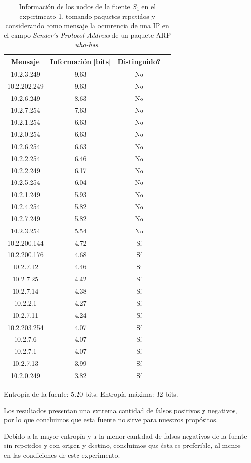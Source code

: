 \begin{table}[t]
    \centering
    \begin{tabular}{ | c | c | c | l |}
        \hline
        Mensaje & Información [bits] & Distinguido?\\
\hline
10.2.3.249 & 9.63 & No \\
\hline
10.2.202.249 & 9.63 & No \\
\hline
10.2.6.249 & 8.63 & No \\
\hline
10.2.7.254 & 7.63 & No \\
\hline
10.2.1.254 & 6.63 & No \\
\hline
10.2.0.254 & 6.63 & No \\
\hline
10.2.6.254 & 6.63 & No \\
\hline
10.2.2.254 & 6.46 & No \\
\hline
10.2.2.249 & 6.17 & No \\
\hline
10.2.5.254 & 6.04 & No \\
\hline
10.2.1.249 & 5.93 & No \\
\hline
10.2.4.254 & 5.82 & No \\
\hline
10.2.7.249 & 5.82 & No \\
\hline
10.2.3.254 & 5.54 & No \\
\hline
10.2.200.144 & 4.72 & Sí \\
\hline
10.2.200.176 & 4.68 & Sí \\
\hline
10.2.7.12 & 4.46 & Sí \\
\hline
10.2.7.25 & 4.42 & Sí \\
\hline
10.2.7.14 & 4.38 & Sí \\
\hline
10.2.2.1 & 4.27 & Sí \\
\hline
10.2.7.11 & 4.24 & Sí \\
\hline
10.2.203.254 & 4.07 & Sí \\
\hline
10.2.7.6 & 4.07 & Sí \\
\hline
10.2.7.1 & 4.07 & Sí \\
\hline
10.2.7.13 & 3.99 & Sí \\
\hline
10.2.0.249 & 3.82 & Sí \\
\hline
    \end{tabular} 
    \caption{Información de los nodos de la fuente $S_1$ en el experimento 1, tomando paquetes repetidos y considerando como mensaje la ocurrencia de una IP en el campo \textit{Sender's Protocol Address} de un paquete ARP \textit{who-has}.}
    \label{tab1R}
\end{table} 

\par Entropía de la fuente: 5.20 bits. Entropía máxima: 32 bits.

\par Los resultados presentan una extrema cantidad de falsos positivos y negativos, por lo que concluimos que esta fuente no sirve para nuestros propósitos.

\par Debido a la mayor entropía y a la menor cantidad de falsos negativos de la fuente sin repetidos y con origen y destino, concluimos que ésta es preferible, al menos en las condiciones de este experimento.
